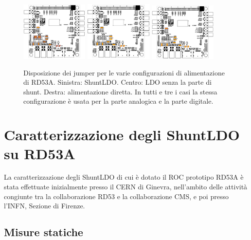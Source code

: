 \begin{figure}[h]
\centering
\includegraphics[width=0.30\textwidth]{Immagini/SLDOmode}
\hfill
\includegraphics[width=0.30\textwidth]{Immagini/LDOmodeDefault}
\hfill
\includegraphics[width=0.30\textwidth]{Immagini/DirectPowering}
\caption{Disposizione dei jumper per le varie configurazioni di alimentazione di RD53A. Sinistra: ShuntLDO. Centro: LDO senza la parte di shunt. Destra: alimentazione diretta. In tutti e tre i casi la stessa configurazione \`e usata per la parte analogica e la parte digitale.}
\label{SLDOmodes}
\end{figure}

\section{Caratterizzazione degli ShuntLDO su RD53A}
\label{MisureStaticheRD53A}

La caratterizzazione degli ShuntLDO di cui \`e dotato il ROC prototipo RD53A \`e stata effettuate inizialmente presso il CERN di Ginevra, nell'ambito delle attivit\`a congiunte tra la collaborazione RD53 e la collaborazione CMS, e poi presso l'INFN, Sezione di Firenze.

\subsection{Misure statiche}


